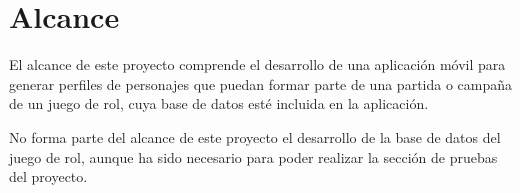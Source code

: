 
\section{Alcance}
El alcance de este proyecto comprende el desarrollo de una aplicación móvil para generar perfiles de personajes que 
puedan formar parte de una partida o campaña de un juego de rol, cuya base de datos esté incluida en la aplicación. \medskip

No forma parte del alcance de este proyecto el desarrollo de la base de datos del juego de rol, aunque ha sido 
necesario para poder realizar la sección de pruebas del proyecto.